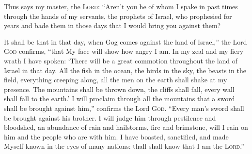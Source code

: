 
\begin{inparaenum}
    
    
    
     Thus says my master, the \textsc{Lord}: ``Aren't you he of whom I spake in past times through the hands of my servants, the prophets of Israel, who prophesied for years and bade them in those days that I would bring you against them?%
    
     It shall be that in that day, when Gog comes against the land of Israel,'' the Lord \textsc{God} confirms, ``that My face will show how angry I am.%
     In my zeal and my fiery wrath I have spoken: `There will be a great commotion throughout the land of Israel in that day.%
     All the fish in the ocean, the birds in the sky, the beasts in the field, everything creeping along, all the men on the earth shall shake at my presence. The mountains shall be thrown down, the cliffs shall fall, every wall shall fall to the earth.'%
     I will proclaim through all the mountains that a sword shall be brought against him,'' confirms the Lord \textsc{God}. ``Every man's sword shall be brought against his brother.%
     I will judge him through pestilence and bloodshed, an abundance of rain and hailstorms, fire and brimstone, will I rain on him and the people who are with him.%
     I have boasted, sanctified, and made Myself known in the eyes of many nations: thall shall know that I am the \textsc{Lord}.''%
\end{inparaenum}
